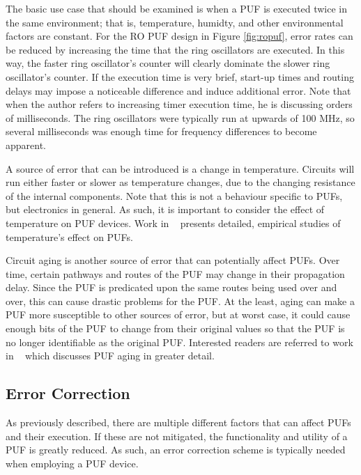 The basic use case that should be examined is when a PUF is executed twice in the same
environment; that is, temperature, humidty, and other environmental factors are constant.
For the RO PUF design in Figure \ref{fig:ropuf}, error rates can be reduced by increasing
the time that the ring oscillators are executed. In this way, the faster ring oscillator's
counter will clearly dominate the slower ring oscillator's counter. If the execution time
is very brief, start-up times and routing delays may impose a noticeable difference and
induce additional error. Note that when the author refers to increasing timer execution
time, he is discussing orders of milliseconds. The ring oscillators were typically run
at upwards of 100 MHz, so several milliseconds was enough time for frequency differences
to become apparent.

A source of error that can be introduced is a change in temperature. Circuits will run 
either faster or slower as temperature changes, due to the changing resistance of the
internal components. Note that this is not a behaviour specific to PUFs, but electronics
in general. As such, it is important to consider the effect of temperature on PUF devices.
Work in ~\cite{puftemp} presents detailed, empirical studies of temperature's effect on
PUFs.


Circuit aging is another source of error that can potentially affect PUFs. Over time,
certain pathways and routes of the PUF may change in their propagation delay. Since the
PUF is predicated upon the same routes being used over and over, this can cause drastic
problems for the PUF. At the least, aging can make a PUF more susceptible to other
sources of error, but at worst case, it could cause enough bits of the PUF to change
from their original values so that the PUF is no longer identifiable as the original PUF.
Interested readers are referred to work in ~\cite{pufaging} 
which discusses PUF aging in greater detail.


\subsection{Error Correction}
As previously described, there are multiple different factors that can affect PUFs
and their execution. If these are not mitigated, the functionality and utility of a PUF
is greatly reduced. As such, an error correction scheme is typically needed when employing
a PUF device.

